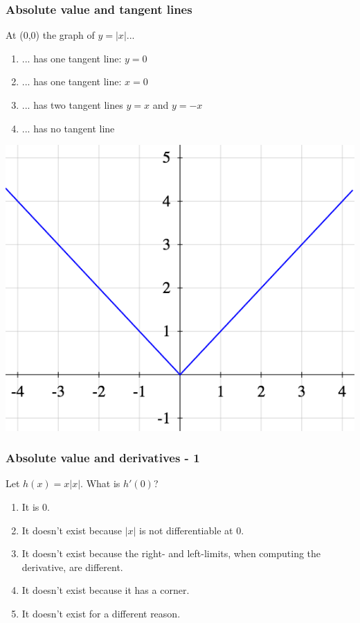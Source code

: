 \begin{frame}[t]
	\frametitle{Absolute value and tangent lines}

	At (0,0) the graph of $\displaystyle y=|x|$...
	\begin{enumerate}
		\item ... has one tangent line: $y=0$

		\item ... has one tangent line: $x=0$

		\item ... has two tangent lines $y=x$ and $y=-x$

		\item ... has no tangent line
	\end{enumerate}

	\begin{center}
		\includegraphics[scale=.25]{G8}
	\end{center}
\end{frame}

\begin{frame}[t]
	\frametitle{Absolute value and derivatives - 1}

	Let $h(x) = x|x|$. What is $h'(0)$?

	\begin{enumerate}
		\item It is 0.

		\item It doesn't exist because $|x|$ is not differentiable at $0$.

		\item It doesn't exist because the right- and left-limits, when computing the
			derivative, are different.

		\item It doesn't exist because it has a corner.

		\item It doesn't exist for a different reason.
	\end{enumerate}
\end{frame}

